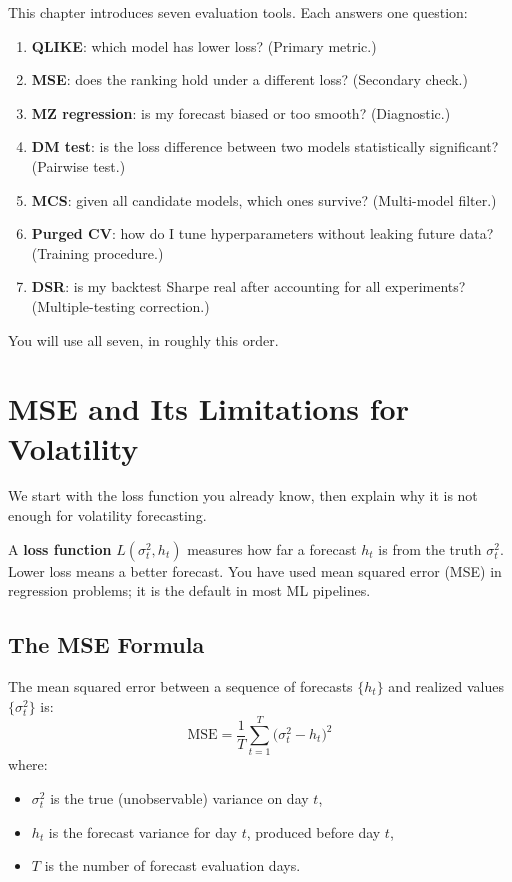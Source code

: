 \begin{keyidea}
This chapter introduces seven evaluation tools.
Each answers one question:
\begin{enumerate}[nosep]
  \item \textbf{QLIKE}: which model has lower loss? (Primary metric.)
  \item \textbf{MSE}: does the ranking hold under a different loss? (Secondary check.)
  \item \textbf{MZ regression}: is my forecast biased or too smooth? (Diagnostic.)
  \item \textbf{DM test}: is the loss difference between two models statistically significant? (Pairwise test.)
  \item \textbf{MCS}: given all candidate models, which ones survive? (Multi-model filter.)
  \item \textbf{Purged CV}: how do I tune hyperparameters without leaking future data? (Training procedure.)
  \item \textbf{DSR}: is my backtest Sharpe real after accounting for all experiments? (Multiple-testing correction.)
\end{enumerate}
You will use all seven, in roughly this order.
\end{keyidea}

\section{MSE and Its Limitations for Volatility}
\label{sec:eval-mse}

We start with the loss function you already know, then explain why it is not enough for volatility forecasting.

\begin{prereq}
A \textbf{loss function} $L(\sigma^2_t, h_t)$ measures how far a forecast $h_t$ is from the truth $\sigma^2_t$.
Lower loss means a better forecast.
You have used mean squared error (MSE) in regression problems; it is the default in most ML pipelines.
\end{prereq}

\subsection{The MSE Formula}

The mean squared error between a sequence of forecasts $\{h_t\}$ and realized values $\{\sigma^2_t\}$ is:
\begin{equation}
\label{eq:mse}
\text{MSE} = \frac{1}{T}\sum_{t=1}^{T} \bigl(\sigma^2_t - h_t\bigr)^2
\end{equation}
where:
\begin{itemize}[nosep]
  \item $\sigma^2_t$ is the true (unobservable) variance on day $t$,
  \item $h_t$ is the forecast variance for day $t$, produced before day $t$,
  \item $T$ is the number of forecast evaluation days.
\end{itemize}

